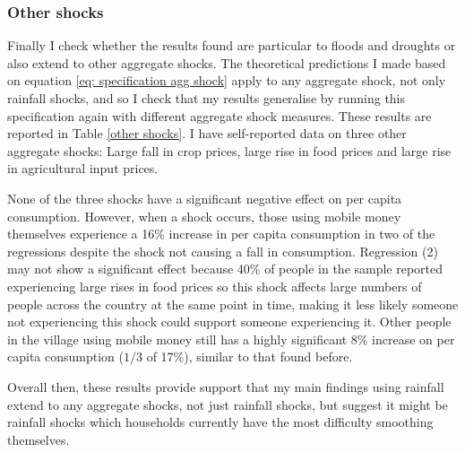 
 
\subsubsection{Other shocks}
Finally I check whether the results found are particular to floods and droughts or also extend to other aggregate shocks. The theoretical predictions I made based on equation \eqref{eq: specification agg shock} apply to any aggregate shock, not only rainfall shocks, and so I check that my results generalise by running this specification again with different aggregate shock measures. These results are reported in Table \ref{other shocks}. I have self-reported data on three other aggregate shocks: Large fall in crop prices, large rise in food prices and large rise in agricultural input prices. 

None of the three shocks have a significant negative effect on per capita consumption. However, when a shock occurs, those using mobile money themselves experience a 16\% increase in per capita consumption in two of the regressions despite the shock not causing a fall in consumption. Regression (2) may not show a significant effect because 40\% of people in the sample reported experiencing large rises in food prices so this shock affects large numbers of people across the country at the same point in time, making it less likely someone not experiencing this shock could support someone experiencing it. Other people in the village using mobile money still has a highly significant 8\% increase on per capita consumption ($1/3$ of 17\%), similar to that found before. 

Overall then, these results provide support that my main findings using rainfall extend to any aggregate shocks, not just rainfall shocks, but suggest it might be rainfall shocks which households currently have the most difficulty smoothing themselves. 







